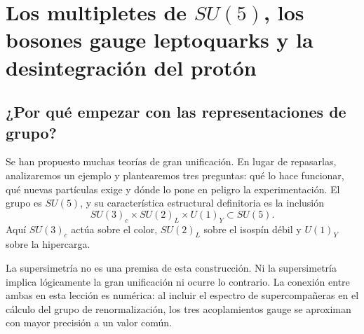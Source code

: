 \chapter{Los multipletes de \texorpdfstring{\(SU(5)\)}{SU(5)}, los bosones gauge leptoquarks y la desintegración del protón}


\section{¿Por qué empezar con las representaciones de grupo?}

Se han propuesto muchas teorías de gran unificación. En lugar de repasarlas, analizaremos un ejemplo y plantearemos tres preguntas: qué lo hace funcionar, qué nuevas partículas exige y dónde lo pone en peligro la experimentación. El grupo es \(SU(5)\), y su característica estructural definitoria es la inclusión
\begin{equation}
SU(3)_c\times SU(2)_L\times U(1)_Y
\subset SU(5).
\label{eq:l10-sm-embedding}
\end{equation}
Aquí \(SU(3)_c\) actúa sobre el color, \(SU(2)_L\) sobre el isospín débil y \(U(1)_Y\) sobre la hipercarga.

La supersimetría no es una premisa de esta construcción. Ni la supersimetría implica lógicamente la gran unificación ni ocurre lo contrario. La conexión entre ambas en esta lección es numérica: al incluir el espectro de supercompañeras en el cálculo del grupo de renormalización, los tres acoplamientos gauge se aproximan con mayor precisión a un valor común.

